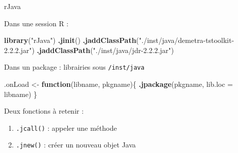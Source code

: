 \documentclass[10pt,xcolor=table,color={dvipsnames,usenames},ignorenonframetext,usepdftitle=false,french]{beamer}
\newenvironment{Shaded}{\begin{snugshade}}{\end{snugshade}}
\newcommand{\ControlFlowTok}[1]{\textcolor[rgb]{0.13,0.29,0.53}{\textbf{#1}}}
\newcommand{\DataTypeTok}[1]{\textcolor[rgb]{0.13,0.29,0.53}{#1}}
\newcommand{\KeywordTok}[1]{\textcolor[rgb]{0.13,0.29,0.53}{\textbf{#1}}}
\newcommand{\NormalTok}[1]{#1}
\newcommand{\StringTok}[1]{\textcolor[rgb]{0.31,0.60,0.02}{#1}}
\begin{document}
\begin{frame}[fragile]{rJava}
\protect\hypertarget{rjava}{}

Dans une session R :

\begin{Shaded}
\begin{Highlighting}[]
\KeywordTok{library}\NormalTok{(}\StringTok{"rJava"}\NormalTok{)}
\KeywordTok{.jinit}\NormalTok{()}
\KeywordTok{.jaddClassPath}\NormalTok{(}\StringTok{"./inst/java/demetra-tstoolkit-2.2.2.jar"}\NormalTok{)}
\KeywordTok{.jaddClassPath}\NormalTok{(}\StringTok{"./inst/java/jdr-2.2.2.jar"}\NormalTok{)}
\end{Highlighting}
\end{Shaded}

\pause

Dans un package : librairies \faJava{} sous \texttt{/inst/java}

\begin{Shaded}
\begin{Highlighting}[]
\NormalTok{.onLoad <-}\StringTok{ }\ControlFlowTok{function}\NormalTok{(libname, pkgname)\{}
  \KeywordTok{.jpackage}\NormalTok{(pkgname, }\DataTypeTok{lib.loc =}\NormalTok{ libname)}
\NormalTok{\}}
\end{Highlighting}
\end{Shaded}

\pause

Deux fonctions à retenir :

\begin{enumerate}
\item
  \texttt{.jcall()} : appeler une méthode
\item
  \texttt{.jnew()} : créer un nouveau objet Java
\end{enumerate}

\end{frame}
\end{document}

